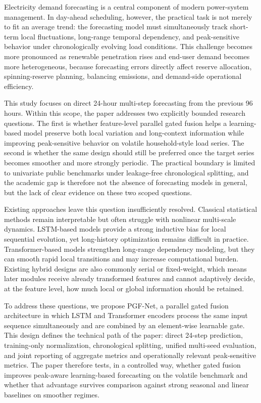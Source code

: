 \documentclass[pdflatex,sn-mathphys-num]{sn-jnl}
\theoremstyle{thmstyleone}
\theoremstyle{thmstyletwo}
\theoremstyle{thmstylethree}
\begin{document}
Electricity demand forecasting is a central component of modern power-system management. In day-ahead scheduling, however, the practical task is not merely to fit an average trend: the forecasting model must simultaneously track short-term local fluctuations, long-range temporal dependency, and peak-sensitive behavior under chronologically evolving load conditions. This challenge becomes more pronounced as renewable penetration rises and end-user demand becomes more heterogeneous, because forecasting errors directly affect reserve allocation, spinning-reserve planning, balancing emissions, and demand-side operational efficiency.\cite{ferdosian2024reserve,aziz2024peak}

This study focuses on direct 24-hour multi-step forecasting from the previous 96 hours. Within this scope, the paper addresses two explicitly bounded research questions. The first is whether feature-level parallel gated fusion helps a learning-based model preserve both local variation and long-context information while improving peak-sensitive behavior on volatile household-style load series. The second is whether the same design should still be preferred once the target series becomes smoother and more strongly periodic. The practical boundary is limited to univariate public benchmarks under leakage-free chronological splitting, and the academic gap is therefore not the absence of forecasting models in general, but the lack of clear evidence on these two scoped questions.

Existing approaches leave this question insufficiently resolved. Classical statistical methods remain interpretable but often struggle with nonlinear multi-scale dynamics. LSTM-based models provide a strong inductive bias for local sequential evolution, yet long-history optimization remains difficult in practice. Transformer-based models strengthen long-range dependency modeling, but they can smooth rapid local transitions and may increase computational burden. Existing hybrid designs are also commonly serial or fixed-weight, which means later modules receive already transformed features and cannot adaptively decide, at the feature level, how much local or global information should be retained.\cite{hochreiter1997long,vaswani2017attention,nie2023time,zeng2023transformers}

To address these questions, we propose PGF-Net, a parallel gated fusion architecture in which LSTM and Transformer encoders process the same input sequence simultaneously and are combined by an element-wise learnable gate. This design defines the technical path of the paper: direct 24-step prediction, training-only normalization, chronological splitting, unified multi-seed evaluation, and joint reporting of aggregate metrics and operationally relevant peak-sensitive metrics. The paper therefore tests, in a controlled way, whether gated fusion improves peak-aware learning-based forecasting on the volatile benchmark and whether that advantage survives comparison against strong seasonal and linear baselines on smoother regimes.
\end{document}
